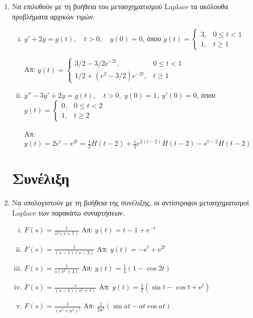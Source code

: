 \begin{enumerate}
  \item Να επιλυθούν με τη βοήθεια του μετασχηματισμού Laplace τα ακόλουθα προβλήματα 
    αρχικών τιμών:
    \begin{enumerate}[i)]
      \item $y'+2y=g(t),\quad t>0,\quad y(0)=0$, όπου $g(t)=
        \begin{cases}
          3, & 0\leq t<1 \\ 
          1, & t\geq 1
        \end{cases}$

        \hfill Απ: $y(t)=
        \begin{cases} 
          {3}/{2}-{3}/{2}e^{-2t},& 0\leq t<1 \\ 
          {1}/{2}+\left(e^2-{3}/{2}\right)e^{-2t}, & t\geq 1
        \end{cases}$

      \item $y''-3y'+2y=g(t),\quad t>0,\; y(0)=1,\; y'(0)=0$, όπου $g(t)=
        \begin{cases} 
          0, & 0\leq t<2 \\ 
          1, & t\geq 2
        \end{cases}$

        \hfill Απ: $y(t)=2e^t-e^{2t}=\frac{1}{2}H(t-2)+\frac{1}{2}e^{2(t-2)}
        H(t-2)-e^{t-2}H(t-2)$
    \end{enumerate}


    \section*{Συνέλιξη}
  

  \item\label{it:conv} 
    Να υπολογιστούν με τη βοήθεια της συνέλιξης, οι αντίστροφοι μετασχηματισμοί 
    Laplace των παρακάτω συναρτήσεων.
    \begin{enumerate}[i)]
      \item $ F(s) = \frac{1}{s^{2}(s+1)} $ \hfill Απ: $ y(t) = t-1+ \mathrm{e}^{-t} $ 
      \item $ F(s) = \frac{1}{(s-1)(s-2)} $ \hfill Απ: $ y(t) = - \mathrm{e}^{t} +
        \mathrm{e}^{2t} $ 
      \item $ F(s) = \frac{1}{s(s^{2}+4)} $ \hfill Απ: $ y(t) = \frac{1}{4} (1-
        \cos{2t}) $ 
      \item $ F(s) = \frac{s}{(s-1)(s^{2}+1)} $ \hfill Απ: $ y(t) = \frac{1}{2}
        (\sin{t} - \cos{t} + \mathrm{e}^{t}) $  
      \item\label{it:conv1} 
        $ F(s) = \frac{1}{(s^{2}+a^{2})^{2}} $ \hfill Απ: $ \frac{1}{2a^{3}} 
        (\sin{at} - at \cos{at}) $ 
    \end{enumerate}
\end{enumerate}


